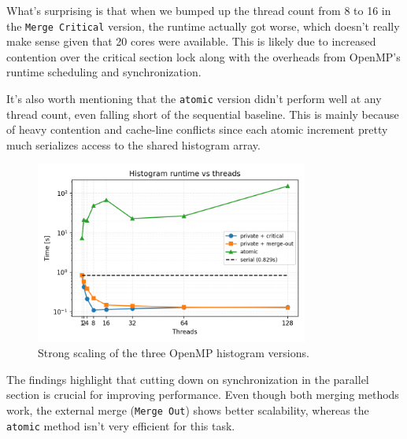 What’s surprising is that when we bumped up the thread count from 8 to 16 in the \texttt{Merge Critical} version, the runtime actually got worse, which doesn’t really make sense given that 20 cores were available. This is likely due to increased contention over the critical section lock along with the overheads from OpenMP’s runtime scheduling and synchronization.

It’s also worth mentioning that the \texttt{atomic} version didn’t perform well at any thread count, even falling short of the sequential baseline. This is mainly because of heavy contention and cache-line conflicts since each atomic increment pretty much serializes access to the shared histogram array.

\begin{figure}[H]
    \centering
    \includegraphics[width=0.8\textwidth]{../Skeleton_codes/hist/plots/hist_runtime_scaling.png}
    \caption{Strong scaling of the three OpenMP histogram versions.}
    \label{fig:histScaling}
\end{figure}

\noindent
The findings highlight that cutting down on synchronization in the parallel section is crucial for improving performance. Even though both merging methods work, the external merge (\texttt{Merge Out}) shows better scalability, whereas the \texttt{atomic} method isn't very efficient for this task.
